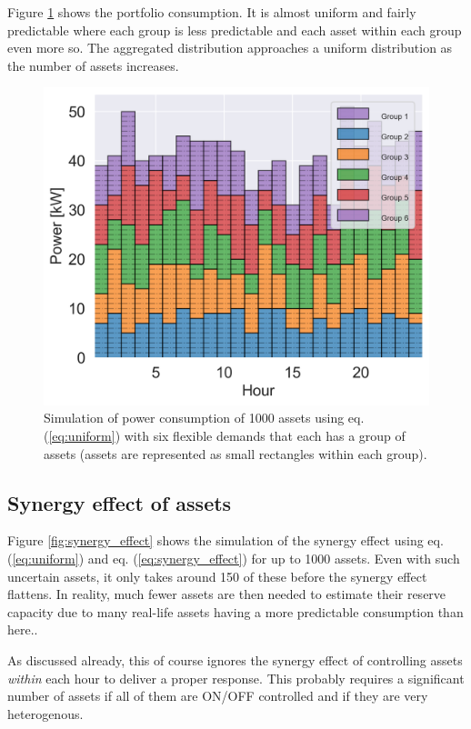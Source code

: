 \documentclass[lettersize,journal]{IEEEtran}
\begin{document}
Figure \ref{fig:assets} shows the portfolio consumption. It is almost uniform and fairly predictable where each group is less predictable and each asset within each group even more so. The aggregated distribution approaches a uniform distribution as the number of assets increases.

\begin{figure}[!t]
    \centering
    \includegraphics[width=\columnwidth]{figures/assets2.png}
    \caption{Simulation of power consumption of 1000 assets using eq. (\ref{eq:uniform}) with six flexible demands that each has a group of assets (assets are represented as small rectangles within each group).}
    \label{fig:assets}
\end{figure}

\subsection{Synergy effect of assets}

Figure \ref{fig:synergy_effect} shows the simulation of the synergy effect using eq. (\ref{eq:uniform}) and 
eq. (\ref{eq:synergy_effect}) for up to 1000 assets. Even with such uncertain assets, it only takes around 150 of these before the synergy effect flattens. In reality, much fewer assets are then needed to estimate their reserve capacity due to many real-life assets having a more predictable consumption than here..

As discussed already, this of course ignores the synergy effect of controlling assets \textit{within} each hour to deliver a proper response. This probably requires a significant number of assets if all of them are ON/OFF controlled and if they are very heterogenous.
\end{document}
